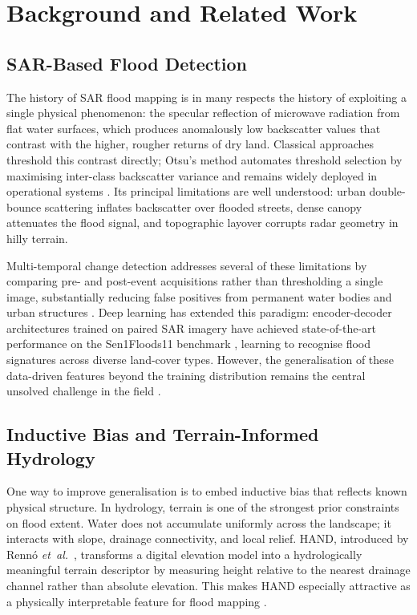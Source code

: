 \documentclass[12pt,oneside]{report}
\newcommand{\etal}{\textit{et~al.}}
\begin{document}
\chapter{Background and Related Work}
\label{ch:related}

\section{SAR-Based Flood Detection}

The history of SAR flood mapping is in many respects the history of exploiting
a single physical phenomenon: the specular reflection of microwave radiation
from flat water surfaces, which produces anomalously low backscatter values
that contrast with the higher, rougher returns of dry land.
Classical approaches threshold this contrast directly; Otsu's method
\cite{otsu1979threshold} automates threshold selection by maximising inter-class
backscatter variance and remains widely deployed in operational systems
\cite{martinis2015fully}.
Its principal limitations are well understood: urban double-bounce scattering
inflates backscatter over flooded streets, dense canopy attenuates the flood
signal, and topographic layover corrupts radar geometry in hilly terrain.

Multi-temporal change detection addresses several of these limitations by
comparing pre- and post-event acquisitions rather than thresholding a single
image, substantially reducing false positives from permanent water bodies and
urban structures \cite{clement2018multi}.
Deep learning has extended this paradigm: encoder-decoder architectures trained
on paired SAR imagery have achieved state-of-the-art performance on the
Sen1Floods11 benchmark \cite{bonafilia2020sen1floods11}, learning to recognise
flood signatures across diverse land-cover types.
However, the generalisation of these data-driven features beyond the training
distribution remains the central unsolved challenge in the field
\cite{zhu2017deep, ma2019deep}.

\section{Inductive Bias and Terrain-Informed Hydrology}

One way to improve generalisation is to embed inductive bias that reflects
known physical structure.
In hydrology, terrain is one of the strongest prior constraints on flood extent.
Water does not accumulate uniformly across the landscape; it interacts with
slope, drainage connectivity, and local relief.
HAND, introduced by Renn\'o \etal~\cite{renno2008hand}, transforms a digital
elevation model into a hydrologically meaningful terrain descriptor by measuring
height relative to the nearest drainage channel rather than absolute elevation.
This makes HAND especially attractive as a physically interpretable feature for
flood mapping \cite{tehrany2015flood, nardi2019gfplain}.
\end{document}
